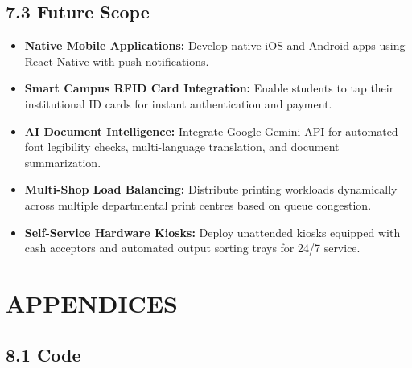 \documentclass[12pt,a4paper]{report}
\begin{document}
\section{7.3 Future Scope}
\begin{itemize}[leftmargin=0.35in, itemsep=2pt]
  \item \textbf{Native Mobile Applications:} Develop native iOS and Android apps using React Native with push notifications.
  \item \textbf{Smart Campus RFID Card Integration:} Enable students to tap their institutional ID cards for instant authentication and payment.
  \item \textbf{AI Document Intelligence:} Integrate Google Gemini API for automated font legibility checks, multi-language translation, and document summarization.
  \item \textbf{Multi-Shop Load Balancing:} Distribute printing workloads dynamically across multiple departmental print centres based on queue congestion.
  \item \textbf{Self-Service Hardware Kiosks:} Deploy unattended kiosks equipped with cash acceptors and automated output sorting trays for 24/7 service.
\end{itemize}

\newpage
\chapter{APPENDICES}

\section{8.1 Code}
\end{document}
